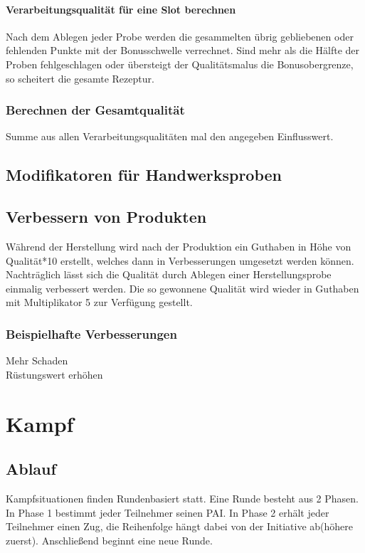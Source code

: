 \documentclass[a4paper,12pt,oneside]{book}
\begin{document}
\subsection{Verarbeitungsqualität für eine Slot berechnen}
Nach dem Ablegen jeder Probe werden die gesammelten übrig gebliebenen oder fehlenden Punkte mit der Bonusschwelle verrechnet. Sind mehr als die Hälfte der Proben fehlgeschlagen oder übersteigt der Qualitätsmalus die Bonusobergrenze, so scheitert die gesamte Rezeptur.

\section{Berechnen der Gesamtqualität}
Summe aus allen Verarbeitungsqualitäten mal den angegeben Einflusswert.

\chapter{Modifikatoren für Handwerksproben}

\chapter{Verbessern von Produkten}
Während der Herstellung wird nach der Produktion ein Guthaben in Höhe von Qualität*10 erstellt, welches dann in Verbesserungen umgesetzt werden können. Nachträglich lässt sich die Qualität durch Ablegen einer Herstellungsprobe einmalig verbessert werden. Die so gewonnene Qualität wird wieder in Guthaben mit Multiplikator 5 zur Verfügung gestellt.

\section{Beispielhafte Verbesserungen}
\begin{description}
\item[Mehr Schaden]
\item[Rüstungswert erhöhen]
\end{description}

\part{Kampf}
\setcounter{chapter}{0}
\chapter{Ablauf}
Kampfsituationen finden Rundenbasiert statt. Eine Runde besteht aus 2 Phasen. 
In Phase 1 bestimmt jeder Teilnehmer seinen PAI. In Phase 2 erhält jeder Teilnehmer einen Zug, die Reihenfolge hängt dabei von der Initiative ab(höhere zuerst).
Anschließend beginnt eine neue Runde.
\end{document}
